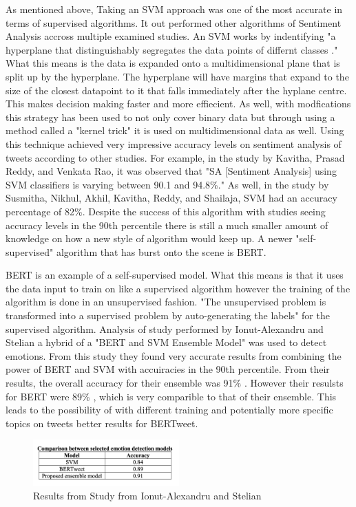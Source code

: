 \documentclass[conference]{IEEEtran}
\begin{document}
As mentioned above, Taking an SVM approach was one of the most accurate in terms of supervised algorithms.
It out performed other algorithms of Sentiment Analysis accross multiple examined studies. 
An SVM works by indentifying "a hyperplane that distinguishably segregates the data points of differnt classes \cite{b6}." 
What this means is the data is expanded onto a multidimensional plane that is split up by the hyperplane. 
The hyperplane will have margins that expand to the size of the closest datapoint to it that falls immediately after the hyplane centre. 
This makes decision making faster and more effiecient. 
As well, with modfications this strategy has been used to not only cover binary data but through using a method called a "kernel trick\cite{b6}" it is used on multidimensional data as well. 
Using this technique achieved very impressive accuracy levels on sentiment analysis of tweets according to other studies.
For example, in the study by Kavitha, Prasad Reddy, and Venkata Rao, it was observed that "SA [Sentiment Analysis] using SVM classifiers is varying between 90.1 and 94.8\%\cite{11}."
As well, in the study by Susmitha, Nikhul, Akhil, Kavitha, Reddy, and Shailaja, SVM had an accuracy percentage of 82\%\cite{b5}. 
Despite the success of this algorithm with studies seeing accuracy levels in the 90th percentile there is still a much smaller amount of knowledge on how a new style of algorithm would keep up.
A newer "self-supervised\cite{b7}" algorithm that has burst onto the scene is BERT.\newline 

BERT is an example of a self-supervised model. 
What this means is that it uses the data input to train on like a supervised algorithm however the training of the algorithm is done in an unsupervised fashion.
"The unsupervised problem is transformed into a supervised problem by auto-generating the labels\cite{b9}" for the supervised algorithm.
Analysis of study performed by Ionut-Alexandru and Stelian a hybrid of a "BERT and SVM Ensemble Model\cite{b8}" was used to detect emotions.
From this study they found very accurate results from combining the power of BERT and SVM with accuiracies in the 90th percentile.
From their results, the overall accuracy for their ensemble was 91\% \cite{b8}.
However their resulsts for BERT were 89\% \cite{b8}, which is very comparible to that of their ensemble.
This leads to the possibility of with different training and potentially more specific topics on tweets better results for BERTweet.

\begin{figure}[htbp]
    \centerline{\includegraphics[width=0.5\textwidth]{BERTweetChartFromStudy.png}}
    \caption{Results from Study from Ionut-Alexandru and Stelian\cite{b8}}
\end{figure}
\end{document}
